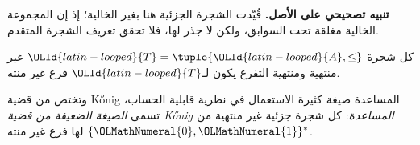 \documentclass[../../../include/open-logic-section]{subfiles}
\begin{document}
\textbf{تنبيه تصحيحي على الأصل.} قُيّدت الشجرة الجزئية هنا بغير الخالية؛
إذ إن المجموعة الخالية مغلقة تحت السوابق، ولكن لا جذر لها، فلا تحقق تعريف
الشجرة المتقدم.

\begin{prop}
كل شجرة ${\OLId{latin-looped}{T}} = \tuple{{\OLId{latin-looped}{A}},\le}$ غير منتهية ومنتهية التفرع يكون لـ${\OLId{latin-looped}{T}}$ فرع غير منته.
\end{prop}

وتختص من قضية \foreignlanguage{english}{K\H{o}nig} المساعدة
صيغة كثيرة الاستعمال في نظرية قابلية الحساب، تسمى
\emph{الصيغة الضعيفة من قضية \foreignlanguage{english}{K\H{o}nig} المساعدة}:
كل شجرة جزئية غير منتهية من $\{{\OLMathNumeral{0}},{\OLMathNumeral{1}}\}^*$ لها فرع غير منته.
\end{document}
